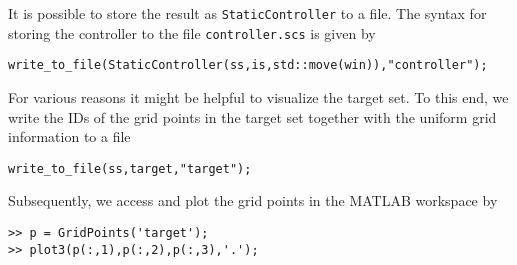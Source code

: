 \documentclass[a4paper]{amsart}
\begin{document}
It is possible to store the result as {\tt StaticController} to a file. The syntax for
storing the controller to the file {\tt controller.scs} is given by
\begin{lstlisting}[basicstyle=\small\ttfamily]
write_to_file(StaticController(ss,is,std::move(win)),"controller");
\end{lstlisting}
For various reasons it might be helpful to visualize the target set. To this
end, we write the IDs of the grid points in the target set together with the
uniform grid information to a file
\begin{lstlisting}[basicstyle=\small\ttfamily]
write_to_file(ss,target,"target");
\end{lstlisting}
Subsequently, we access and plot the grid points in the MATLAB workspace by
\begin{lstlisting}[basicstyle=\small\ttfamily]
>> p = GridPoints('target');
>> plot3(p(:,1),p(:,2),p(:,3),'.');
\end{lstlisting}
\end{document}
